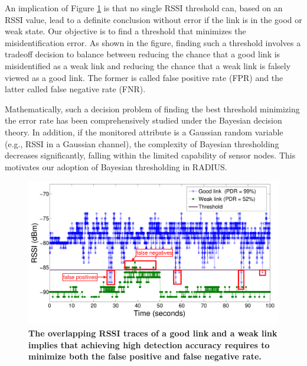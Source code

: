 An implication of Figure \ref{fig:PIMRC-RSSI} is that no single RSSI threshold can, based on an RSSI value, lead to a definite conclusion without error if the link is in the good or weak state. Our objective is to find a threshold that minimizes the misidentification error. As shown in the figure, finding such a threshold involves a tradeoff decision to balance between reducing the chance that a good link is misidentified as a weak link and reducing the chance that a weak link is falsely viewed as a good link. The former is called false positive rate (FPR) and the latter called false negative rate (FNR). 

Mathematically, such a decision problem of finding the best threshold minimizing the error rate has been comprehensively studied under the Bayesian decision theory. In addition, if the monitored attribute is a Gaussian random variable (e.g., RSSI in a Gaussian channel), the complexity of Bayesian thresholding decreases significantly, falling within the limited capability of sensor nodes. This motivates our adoption of Bayesian thresholding in RADIUS. 

\begin{figure}[t]
	\centering
	\includegraphics[width=1\linewidth]{PIMRC-RSSI}
	\vspace{-0.9cm}
	\caption{\textbf{The overlapping RSSI traces of a good link and a weak link implies that achieving high detection accuracy requires to minimize both the false positive and false negative rate.}}	
	\label{fig:PIMRC-RSSI}
	\vspace{-0.7cm}
\end{figure}

